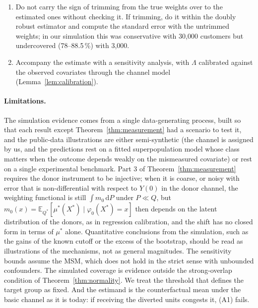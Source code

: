 \documentclass[twoside,11pt]{article}
\newcommand{\E}{\mathbb{E}}
\newcommand{\dd}{\,\mathrm{d}}
\theoremstyle{plain}
\theoremstyle{definition}
\begin{document}
\begin{enumerate}
  \item Do not carry the sign of trimming from the true weights over to the estimated ones without checking it. If trimming, do it within the doubly robust estimator and compute the standard error with the untrimmed weights; in our simulation this was conservative with 30{,}000 customers but undercovered (78--88.5\,\%) with 3{,}000.
  \item Accompany the estimate with a sensitivity analysis, with $\Lambda$ calibrated against the observed covariates through the channel model (Lemma~\ref{lem:calibration}).
\end{enumerate}

\paragraph{Limitations.} The simulation evidence comes from a single data-generating process, built so that each result except Theorem~\ref{thm:measurement} had a scenario to test it, and the public-data illustrations are either semi-synthetic (the channel is assigned by us, and the predictions rest on a fitted superpopulation model whose class matters when the outcome depends weakly on the mismeasured covariate) or rest on a single experimental benchmark. Part 3 of Theorem~\ref{thm:measurement} requires the donor instrument to be injective; when it is coarse, or noisy with error that is non-differential with respect to $Y(0)$ in the donor channel, the weighting functional is still $\int m_0\dd P$ under $P\ll Q$, but $m_0(x)=\E_{Q^*}[\mu^*(X^*)\mid\varphi_0(X^*)=x]$ then depends on the latent distribution of the donors, as in regression calibration, and the shift has no closed form in terms of $\mu^*$ alone. Quantitative conclusions from the simulation, such as the gains of the known cutoff or the excess of the bootstrap, should be read as illustrations of the mechanisms, not as general magnitudes. The sensitivity bounds assume the MSM, which does not hold in the strict sense with unbounded confounders. The simulated coverage is evidence outside the strong-overlap condition of Theorem~\ref{thm:normality}. We treat the threshold that defines the target group as fixed. And the estimand is the counterfactual mean under the basic channel as it is today: if receiving the diverted units congests it, (A1) fails.
\end{document}
